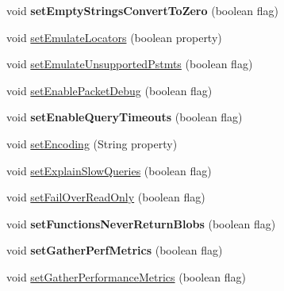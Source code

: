 \begin{DoxyCompactItemize}
void {\bfseries set\+Empty\+Strings\+Convert\+To\+Zero} (boolean flag)
\item 
void \mbox{\hyperlink{classcom_1_1mysql_1_1jdbc_1_1jdbc2_1_1optional_1_1_connection_wrapper_aa54e4168297c0975cb337fd18c989eac}{set\+Emulate\+Locators}} (boolean property)
\item 
void \mbox{\hyperlink{classcom_1_1mysql_1_1jdbc_1_1jdbc2_1_1optional_1_1_connection_wrapper_a44f6dda9f93deaa617804ab20b7790d1}{set\+Emulate\+Unsupported\+Pstmts}} (boolean flag)
\item 
void \mbox{\hyperlink{classcom_1_1mysql_1_1jdbc_1_1jdbc2_1_1optional_1_1_connection_wrapper_a8aa46e9a081e1832ae682449584a218e}{set\+Enable\+Packet\+Debug}} (boolean flag)
\item 
\mbox{\label{classcom_1_1mysql_1_1jdbc_1_1jdbc2_1_1optional_1_1_connection_wrapper_a72ef27a5afaed62cbd330f1f8eafe51d}} 
void {\bfseries set\+Enable\+Query\+Timeouts} (boolean flag)
\item 
void \mbox{\hyperlink{classcom_1_1mysql_1_1jdbc_1_1jdbc2_1_1optional_1_1_connection_wrapper_ab8560df5f3d4e0152cd9181509c1e1ae}{set\+Encoding}} (String property)
\item 
void \mbox{\hyperlink{classcom_1_1mysql_1_1jdbc_1_1jdbc2_1_1optional_1_1_connection_wrapper_a87b59ff60acc2b82007b597ca7c56799}{set\+Explain\+Slow\+Queries}} (boolean flag)
\item 
void \mbox{\hyperlink{classcom_1_1mysql_1_1jdbc_1_1jdbc2_1_1optional_1_1_connection_wrapper_a23b3e7be6b29af8786a6641fec4196aa}{set\+Fail\+Over\+Read\+Only}} (boolean flag)
\item 
\mbox{\label{classcom_1_1mysql_1_1jdbc_1_1jdbc2_1_1optional_1_1_connection_wrapper_ab9108d34cf1049e04d59a918f569a288}} 
void {\bfseries set\+Functions\+Never\+Return\+Blobs} (boolean flag)
\item 
\mbox{\label{classcom_1_1mysql_1_1jdbc_1_1jdbc2_1_1optional_1_1_connection_wrapper_a11c3662daf1e68596e193fe91ecb9197}} 
void {\bfseries set\+Gather\+Perf\+Metrics} (boolean flag)
\item 
void \mbox{\hyperlink{classcom_1_1mysql_1_1jdbc_1_1jdbc2_1_1optional_1_1_connection_wrapper_a245c02868e2569c0144af26ede2258e9}{set\+Gather\+Performance\+Metrics}} (boolean flag)

\end{DoxyCompactItemize}
